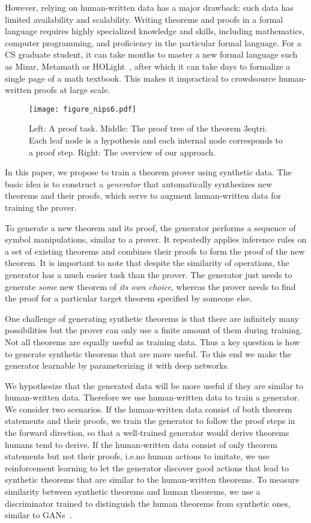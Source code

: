 \documentclass{article}
\begin{document}
However, relying on human-written data has a major drawback: such data has limited availability and scalability. Writing theorems and proofs in a formal language requires highly specialized knowledge and skills, including mathematics, computer programming, and proficiency in the particular formal language. For a CS graduate student, it can take months to master a new formal language such as Mizar, Metamath or HOLight~\citep{wiedijk2003formal}, after which it can take days to formalize a single page of a math textbook. This makes it impractical to crowdsource human-written proofs at large scale. 

\begin{figure}[t]
\centering 
\texttt{[image: figure\_nips6.pdf]}
\vskip -0.1in
\caption{
Left: A proof task. 
Middle: The proof tree of the theorem 3eqtri. 
Each leaf node is a hypothesis and each internal node corresponds to a proof step. 
Right: The overview of our approach. 
}
\label{figure:proof}
\vskip -0.2in
\end{figure}

In this paper, we propose to train a theorem prover using synthetic data. The basic idea is to construct a \emph{generator} that automatically synthesizes new theorems and their proofs, which serve to augment human-written data for training the prover. 

To generate a new theorem and its proof, the generator performs a sequence of symbol manipulations, similar to a prover. It repeatedly applies inference rules on a set of existing theorems and combines their proofs to form the proof of the new theorem.
It is important to note that despite the similarity of operations, the generator has a much easier task than the prover. The generator just needs to generate  \emph{some} new theorem of \emph{its own choice}, whereas the prover needs to find the proof for a particular target theorem specified by someone else. 

One challenge of generating synthetic theorems is that there are infinitely many possibilities but the prover can only use a finite amount of them during training. Not all theorems are equally useful as training data. Thus a key question is how to generate synthetic theorems that are more useful. To this end we make the generator learnable by parameterizing it with deep networks. 

We hypothesize that the generated data will be more useful if they are similar to human-written data. Therefore we use human-written data to train a generator. We consider two scenarios. If the human-written data consist of both theorem statements and their proofs, we train the generator to follow the proof steps in the forward direction, so that a well-trained generator would derive theorems humans tend to derive. If the human-written data consist of only theorem statements but not their proofs, i.e.\@ no human actions to imitate, we use reinforcement learning to let the generator discover good actions that lead to synthetic theorems that are similar to the human-written theorems. To measure similarity between synthetic theorems and human theorems, we use a discriminator trained to distinguish the human theorems from synthetic ones, similar to GANs~\citep{goodfellow2014generative}. 
\end{document}
